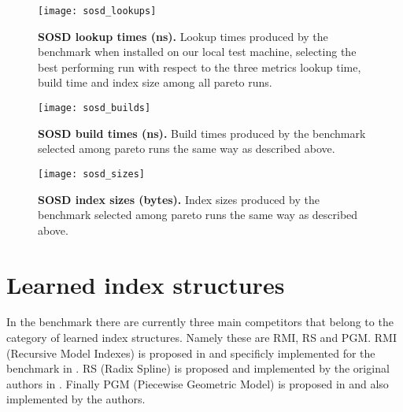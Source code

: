 \begin{figure}[ht]
\centering
\texttt{[image: sosd\_lookups]}
\caption[SOSD Lookups]{
  \textbf{SOSD lookup times (ns).}
  Lookup times produced by the benchmark when installed on our local test machine, selecting the best performing run with respect to the three metrics lookup time, build time and index size among all pareto runs.
}
\label{fig:sosd_lookups}
\end{figure}

\begin{figure}[ht]
\centering
\texttt{[image: sosd\_builds]}
\caption[SOSD Build Times]{
  \textbf{SOSD build times (ns).}
  Build times produced by the benchmark selected among pareto runs the same way as described above.
}
\label{fig:sosd_builds}
\end{figure}

\begin{figure}[ht]
\centering
\texttt{[image: sosd\_sizes]}
\caption[SOSD index sizes]{
  \textbf{SOSD index sizes (bytes).}
  Index sizes produced by the benchmark selected among pareto runs the same way as described above.
}
\label{fig:sosd_sizes}
\end{figure}


\section{Learned index structures}
In the benchmark there are currently three main competitors that belong to the category of learned index structures. Namely these are RMI, RS and PGM. RMI (Recursive Model Indexes) is proposed in \cite{rmi} and specificly implemented for the benchmark in \cite{cdfshop}. RS (Radix Spline) is proposed and implemented by the original authors in \cite{radixspline}. Finally PGM (Piecewise Geometric Model) is proposed in \cite{pgm} and also implemented by the authors.

